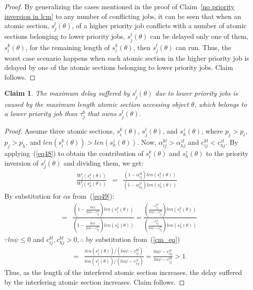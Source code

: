\documentclass[a4paper,english]{article}
\newtheorem{clm}{Claim}
\newtheorem{proof}{Proof}
\begin{document}
\begin{proof}\normalfont
By generalizing the cases mentioned in the proof of Claim~\ref{no priority inversion in lcm} to any number of conflicting jobs, it can be seen that when an atomic section, $s_j^l(\theta)$, of a higher priority job conflicts with a number of atomic sections belonging to lower priority jobs, $s_j^l(\theta)$ can be delayed only one of them, $s_i^k(\theta)$, for the remaining length of $s_i^k(\theta)$, then $s_j^l(\theta)$ can run. Thus, the worst case scenario happens when each atomic section in the higher priority job is delayed by one of the atomic sections belonging to lower priority jobs. Claim follows.
\end{proof}


\begin{clm}
\label{max_pri_inv}
The maximum delay suffered by $s_j^l(\theta)$ due to lower priority jobs is caused by the maximum length atomic section accessing object $\theta$, which belongs to a lower priority job than $\tau_j^b$ that owns $s_j^l(\theta)$.
\end{clm}

\begin{proof}\normalfont
Assume three atomic sections, $s_i^k(\theta)$, $s_j^l(\theta)$, and $s_h^z(\theta)$, where $p_j>p_i$, $p_j>p_h$, and $len(s_i^k(\theta))>len(s_h^z(\theta))$. Now, $\alpha_{ij}^{kl}>\alpha_{hj}^{zl}$ and $c_{ij}^{kl}<c_{hj}^{zl}$. By applying~(\ref{eq48}) to obtain the contribution of $s_i^k(\theta)$ and $s_h^z(\theta)$ to the priority inversion of $s_j^l(\theta)$ and dividing them, we get:
\begin{eqnarray*}
\frac{W_{j}^{l}(s_{i}^{k}(\theta))}{W_{j}^{l}(s_{h}^{z}(\theta))} & = & \frac{\left(1-\alpha_{ij}^{kl}\right)len(s_{i}^{k}(\theta))}{\left(1-\alpha_{hj}^{zl}\right)len(s_{h}^{z}(\theta))}
\end{eqnarray*}
By substitution for $\alpha$s from~(\ref{eq49}):
\begin{eqnarray*}
 & = & \frac{(1-\frac{ln\psi}{ln\psi-c_{ij}^{kl}})len(s_{i}^{k}(\theta))}{(1-\frac{ln\psi}{ln\psi-c_{hj}^{zl}})len(s_{h}^{z}(\theta))}
  =  \frac{(\frac{-c_{ij}^{kl}}{ln\psi-c_{ij}^{kl}})len(s_{i}^{k}(\theta))}{(\frac{-c_{hj}^{zl}}{ln\psi-c_{hj}^{zl}})len(s_{h}^{z}(\theta))}\end{eqnarray*}
$\because ln\psi \le 0$ and $c_{ij}^{kl},c_{hj}^{kl} > 0, \therefore$ by substitution from~(\ref{cm_eq})
\begin{eqnarray*}
 & = & \frac{len(s_{j}^{l}(\theta))/(ln\psi-c_{ij}^{kl})}{len(s_{j}^{l}(\theta))/(ln\psi-c_{hj}^{zl})}
  =  \frac{ln\psi-c_{hj}^{zl}}{ln\psi-c_{ij}^{kl}}>1\end{eqnarray*}
Thus, as the length of the interfered atomic section increases, the delay suffered by the interfering atomic section increases. Claim follows.
\end{proof}
\end{document}

